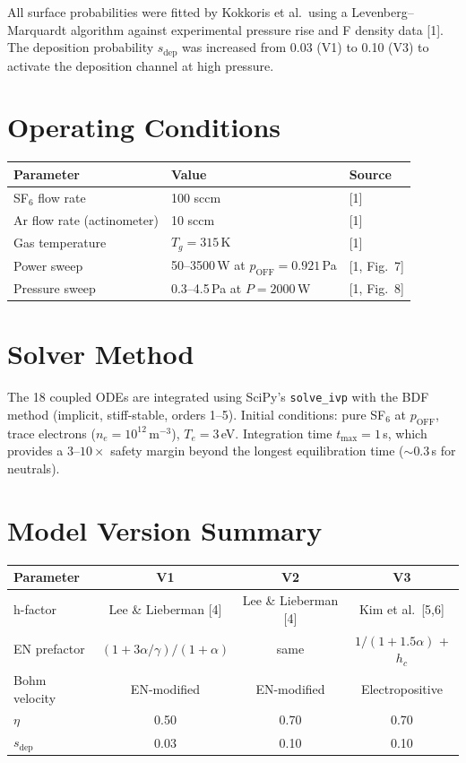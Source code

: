 \documentclass[11pt,a4paper]{article}
\begin{document}
All surface probabilities were fitted by Kokkoris et al.\ using a Levenberg--Marquardt algorithm against experimental pressure rise and F density data [1]. The deposition probability $s_\text{dep}$ was increased from 0.03 (V1) to 0.10 (V3) to activate the deposition channel at high pressure.

\section{Operating Conditions}

\begin{table}[H]
\centering
\begin{tabular}{lll}
\toprule
\textbf{Parameter} & \textbf{Value} & \textbf{Source} \\
\midrule
SF$_6$ flow rate & 100 sccm & [1] \\
Ar flow rate (actinometer) & 10 sccm & [1] \\
Gas temperature & $T_g = 315$\,K & [1] \\
Power sweep & 50--3500\,W at $p_\text{OFF} = 0.921$\,Pa & [1, Fig.~7] \\
Pressure sweep & 0.3--4.5\,Pa at $P = 2000$\,W & [1, Fig.~8] \\
\bottomrule
\end{tabular}
\end{table}

\section{Solver Method}

The 18 coupled ODEs are integrated using SciPy's \texttt{solve\_ivp} with the BDF method (implicit, stiff-stable, orders 1--5). Initial conditions: pure SF$_6$ at $p_\text{OFF}$, trace electrons ($n_e = 10^{12}$\,m$^{-3}$), $T_e = 3$\,eV. Integration time $t_\text{max} = 1$\,s, which provides a $3$--$10\times$ safety margin beyond the longest equilibration time (${\sim}0.3$\,s for neutrals).

\section{Model Version Summary}

\begin{table}[H]
\centering
\begin{tabular}{lccc}
\toprule
\textbf{Parameter} & \textbf{V1} & \textbf{V2} & \textbf{V3} \\
\midrule
h-factor & Lee \& Lieberman [4] & Lee \& Lieberman [4] & Kim et al.\ [5,6] \\
EN prefactor & $(1+3\alpha/\gamma)/(1+\alpha)$ & same & $1/(1+1.5\alpha)$ + $h_c$ \\
Bohm velocity & EN-modified & EN-modified & Electropositive \\
$\eta$ & 0.50 & 0.70 & 0.70 \\
$s_\text{dep}$ & 0.03 & 0.10 & 0.10 \\
\bottomrule
\end{tabular}
\end{table}
\end{document}
